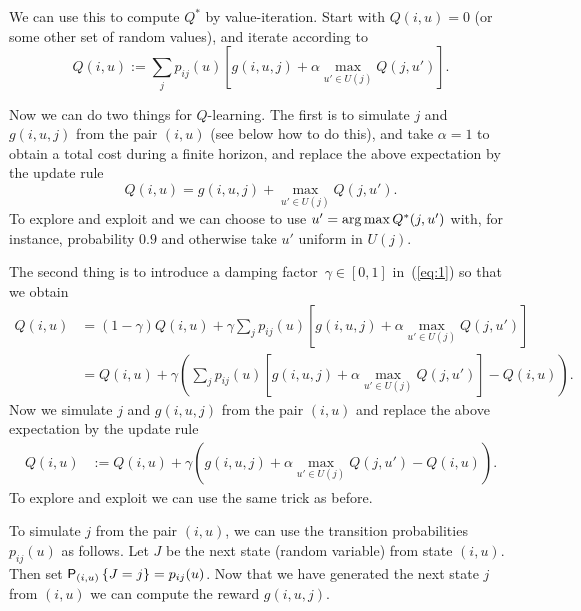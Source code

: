 \documentclass{article}
\begin{document}
We can use this to compute $Q^*$ by value-iteration.  Start with
$Q(i,u)=0$ (or some other set of random values), and iterate according to
\begin{equation}\label{eq:1}
  Q(i,u) :=   \sum_{j} p_{ij}(u) \left[g(i,u,j) + \alpha \max_{u'\in U(j)} Q(j,u')\right].
\end{equation}

Now we can do two things for $Q$-learning.  The first is to  simulate $j$  and $g(i,u,j)$ from the
pair $(i,u)$ (see below how to do this), and take $\alpha=1$ to obtain a total cost during a finite horizon, and replace the above expectation by the update rule
\begin{equation*}
  Q(i,u)  = g(i,u,j) + \max_{u'\in U(j)} Q(j,u').
\end{equation*}
To explore and exploit and we can choose to use
$u' = \argmax Q^*(j,u')$ with, for instance, probability $0.9$ and
otherwise take $u'$ uniform in $U(j)$.

The second thing is to introduce a damping factor~$\gamma\in[0,1]$ in~(\ref{eq:1}) so that we obtain 
\begin{equation*}
  \begin{split}
  Q(i,u) 
&=  (1-\gamma)Q(i,u) + \gamma \sum_{j} p_{ij}(u) \left[g(i,u,j) + \alpha \max_{u'\in U(j)} Q(j,u')\right] \\
&=  Q(i,u) + \gamma \left(\sum_{j} p_{ij}(u) \left[g(i,u,j) + \alpha \max_{u'\in U(j)} Q(j,u')\right] - Q(i,u)\right).
  \end{split}
\end{equation*}
Now we simulate $j$ and $g(i,u,j)$ from the
pair $(i,u)$ and replace the above expectation by the update rule
\begin{equation}\label{eq:3}
  \begin{split}
  Q(i,u) 
&:=  Q(i,u) + \gamma \left(g(i,u,j) + \alpha \max_{u'\in U(j)} Q(j,u')- Q(i,u)\right).
  \end{split}
\end{equation}
To explore and exploit  we can use the same trick as before.

\begin{remark}
  To simulate $j$ from the pair $(i,u)$,  we can use the transition probabilities $p_{ij}(u)$ as follows. Let $J$ be the next state (random variable) from state $(i,u)$. Then set $\P{J=j}_{(i,u)} = p_{ij}(u)$.  Now that we have generated the next state $j$ from $(i,u)$ we can compute the reward $g(i,u,j)$. 
\end{remark}
\end{document}
